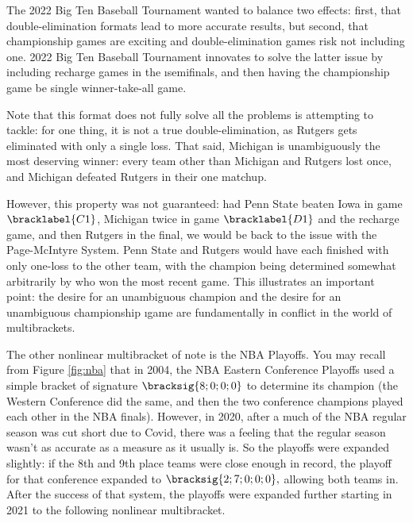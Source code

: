 {    

    The 2022 Big Ten Baseball Tournament wanted to balance two effects: first, that double-elimination formats lead to more accurate results, but second, that championship games are exciting and double-elimination games risk not including one. 2022 Big Ten Baseball Tournament innovates to solve the latter issue by including recharge games in the \i{semifinals}, and then having the championship game be single winner-take-all game.

    Note that this format does not fully solve all the problems is attempting to tackle: for one thing, it is not a true double-elimination, as Rutgers gets eliminated with only a single loss. That said, Michigan is unambiguously the most deserving winner: every team other than Michigan and Rutgers lost once, and Michigan defeated Rutgers in their one matchup.
    
    However, this property was not guaranteed: had Penn State beaten Iowa in game $\bracklabel{C1}$, Michigan twice in game $\bracklabel{D1}$ and the recharge game, and then Rutgers in the final, we would be back to the issue with the Page-McIntyre System. Penn State and Rutgers would have each finished with only one-loss to the other team, with the champion being determined somewhat arbitrarily by who won the most recent game. This illustrates an important point: the desire for an unambiguous champion and the desire for an unambiguous championship \i{game} are fundamentally in conflict in the world of multibrackets.

    The other nonlinear multibracket of note is the NBA Playoffs. You may recall from Figure \ref{fig:nba} that in 2004, the NBA Eastern Conference Playoffs used a simple bracket of signature $\bracksig{8;0;0;0}$ to determine its champion (the Western Conference did the same, and then the two conference champions played each other in the NBA finals). However, in 2020, after a much of the NBA regular season was cut short due to Covid, there was a feeling that the regular season wasn't as accurate as a measure as it usually is. So the playoffs were expanded slightly: if the 8th and 9th place teams were close enough in record, the playoff for that conference expanded to $\bracksig{2;7;0;0;0},$ allowing both teams in. After the success of that system, the playoffs were expanded further starting in 2021 to the following nonlinear multibracket.
    

}

